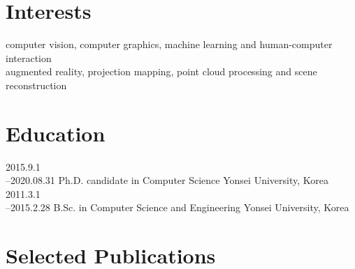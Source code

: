 \documentclass[]{friggeri-cv}
\begin{document}

\section{Interests}

computer vision, computer graphics, machine learning and human-computer interaction\\
augmented reality, projection mapping, point cloud processing and scene reconstruction

\par\null\par\null\par
\section{Education}

\begin{entrylist}
  \entry
    {2015.9.1\\--2020.08.31}
    {Ph.D. {\normalfont candidate in Computer Science}}
    {Yonsei University, Korea}
    {}
  \entry
    {2011.3.1\\--2015.2.28}
    {B.Sc. {\normalfont in Computer Science and Engineering}}
    {Yonsei University, Korea}
    {}
\end{entrylist}

\par\null\par\null\par
\section{Selected Publications}

\begin{refsection}
  \nocite{*}
  \printbibliography[
    type=article, 
    title=\textbf{Journal articles}, 
    heading=subbibliography,
    keyword={selected}
  ]
\end{refsection}
\end{document}
